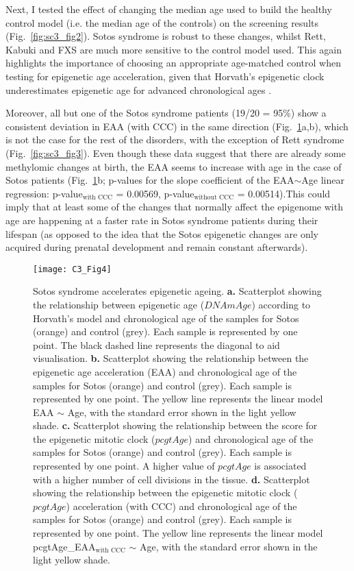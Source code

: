 Next, I tested the effect of changing the median age used to build the healthy control model (i.e. the median age of the controls) on the screening results (Fig.~\ref{fig:sc3_fig2}). Sotos syndrome is robust to these changes, whilst Rett, Kabuki and FXS are much more sensitive to the control model used. This again highlights the importance of choosing an appropriate age-matched control when testing for epigenetic age acceleration, given that Horvath’s epigenetic clock underestimates epigenetic age for advanced chronological ages \citep{ElKhoury2018,Marioni2018}.

\bigskip

Moreover, all but one of the Sotos syndrome patients (19/20 = 95\%) show a consistent deviation in EAA (with CCC) in the same direction (Fig.~\ref{fig:c3_fig4}a,b), which is not the case for the rest of the disorders, with the exception of Rett syndrome (Fig.~\ref{fig:sc3_fig3}). Even though these data suggest that there are already some methylomic changes at birth, the EAA seems to increase with age in the case of Sotos patients (Fig.~\ref{fig:c3_fig4}b; p-values for the slope coefficient of the EAA$\sim$Age linear regression: p-value$_{\text{with CCC}}$ = 0.00569, p-value$_{\text{without CCC}}$ = 0.00514).This could imply that at least some of the changes that normally affect the epigenome with age are happening at a faster rate in Sotos syndrome patients during their lifespan (as opposed to the idea that the Sotos epigenetic changes are only acquired during prenatal development and remain constant afterwards).

\begin{figure}[htbp!] 
	\centering    
	\texttt{[image: C3\_Fig4]}
	\caption[Sotos syndrome accelerates epigenetic ageing]{Sotos syndrome accelerates epigenetic ageing. \textbf{a.} Scatterplot showing the relationship between epigenetic age ($DNAmAge$) according to Horvath’s model \citep{Horvath2013} and chronological age of the samples for Sotos (orange) and control (grey). Each sample is represented by one point. The black dashed line represents the diagonal to aid visualisation. \textbf{b.} Scatterplot showing the relationship between the epigenetic age acceleration (EAA) and chronological age of the samples for Sotos (orange) and control (grey). Each sample is represented by one point. The yellow line represents the linear model EAA $\sim$ Age, with the standard error shown in the light yellow shade. \textbf{c.} Scatterplot showing the relationship between the score for the epigenetic mitotic clock ($pcgtAge$) \citep{Yang2016} and chronological age of the samples for Sotos (orange) and control (grey). Each sample is represented by one point. A higher value of $pcgtAge$ is associated with a higher number of cell divisions in the tissue. \textbf{d.} Scatterplot showing the relationship between the epigenetic mitotic clock ($pcgtAge$) acceleration (with CCC) and chronological age of the samples for Sotos (orange) and control (grey). Each sample is represented by one point. The yellow line represents the linear model pcgtAge\_EAA$_{\text{with CCC}}$ $\sim$ Age, with the standard error shown in the light yellow shade.}
	\label{fig:c3_fig4}
\end{figure}

